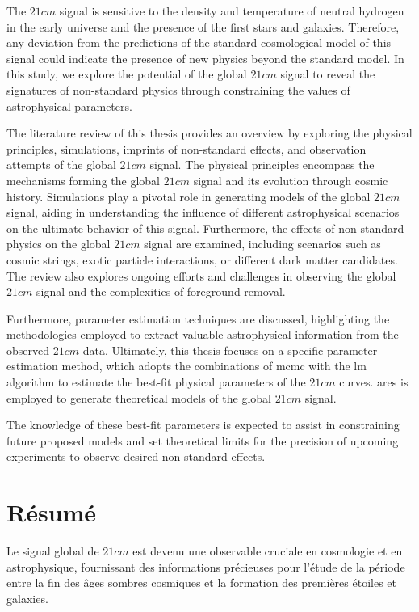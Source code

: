 \documentclass[12pt, TexShade, letterpaper]{report}
\begin{document}
The $21cm$ signal is sensitive to the density and temperature of neutral hydrogen in the early universe and the presence of the first stars and galaxies. Therefore, any deviation from the predictions of the standard cosmological model of this signal could indicate the presence of new physics beyond the standard model.
In this study, we explore the potential of the global $21cm$ signal to reveal the signatures of non-standard physics through constraining the values of astrophysical parameters.\par

The literature review of this thesis provides an overview by exploring the physical principles, simulations, imprints of non-standard effects, and observation attempts of the global $21cm$ signal. The physical principles encompass the mechanisms forming the global $21cm$ signal and its evolution through cosmic history. Simulations play a pivotal role in generating models of the global $21cm$ signal, aiding in understanding the influence of different astrophysical scenarios on the ultimate behavior of this signal. Furthermore, the effects of non-standard physics on the global $21cm$ signal are examined, including scenarios such as cosmic strings, exotic particle interactions, or different dark matter candidates. The review also explores ongoing efforts and challenges in observing the global $21cm$ signal and the complexities of foreground removal.\par

Furthermore, parameter estimation techniques are discussed, highlighting the methodologies employed to extract valuable astrophysical information from the observed $21cm$ data. Ultimately, this thesis focuses on a specific parameter estimation method, which adopts the combinations of \gls{mcmc} with the \gls{lm} algorithm to estimate the best-fit physical parameters of the $21cm$ curves. \gls{ares} is employed to generate theoretical models of the global $21cm$ signal.\par

The knowledge of these best-fit parameters is expected to assist in constraining future proposed models and set theoretical limits for the precision of upcoming experiments to observe desired non-standard effects.\par
\chapter*{Résumé}
	\label{chap:frAbstract}
Le signal global de $21cm$ est devenu une observable cruciale en cosmologie et en astrophysique, fournissant des informations précieuses pour l'étude de la période entre la fin des âges sombres cosmiques et la formation des premières étoiles et galaxies.\par
\end{document}
